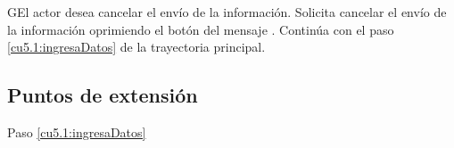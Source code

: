  \begin{UCtrayectoriaA}{G}{El actor desea cancelar el envío de la información.}
    \UCpaso[\UCactor] Solicita cancelar el envío de la información oprimiendo el botón  del mensaje .
    \UCpaso[] Continúa con el paso \ref{cu5.1:ingresaDatos} de la trayectoria principal.
 \end{UCtrayectoriaA}

\subsection{Puntos de extensión}

	{Paso \ref{cu5.1:ingresaDatos}}
	{}